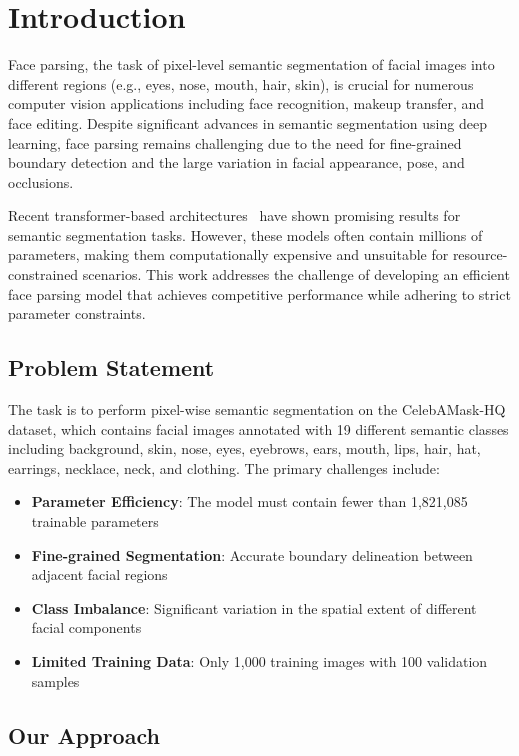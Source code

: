 \section{Introduction}
\label{sec:intro}

Face parsing, the task of pixel-level semantic segmentation of facial images into different regions (e.g., eyes, nose, mouth, hair, skin), is crucial for numerous computer vision applications including face recognition, makeup transfer, and face editing. Despite significant advances in semantic segmentation using deep learning, face parsing remains challenging due to the need for fine-grained boundary detection and the large variation in facial appearance, pose, and occlusions.

Recent transformer-based architectures~\cite{xie2021segformer} have shown promising results for semantic segmentation tasks. However, these models often contain millions of parameters, making them computationally expensive and unsuitable for resource-constrained scenarios. This work addresses the challenge of developing an efficient face parsing model that achieves competitive performance while adhering to strict parameter constraints.

\subsection{Problem Statement}

The task is to perform pixel-wise semantic segmentation on the CelebAMask-HQ dataset, which contains facial images annotated with 19 different semantic classes including background, skin, nose, eyes, eyebrows, ears, mouth, lips, hair, hat, earrings, necklace, neck, and clothing. The primary challenges include:

\begin{itemize}
    \item \textbf{Parameter Efficiency}: The model must contain fewer than 1,821,085 trainable parameters
    \item \textbf{Fine-grained Segmentation}: Accurate boundary delineation between adjacent facial regions
    \item \textbf{Class Imbalance}: Significant variation in the spatial extent of different facial components
    \item \textbf{Limited Training Data}: Only 1,000 training images with 100 validation samples
\end{itemize}

\subsection{Our Approach}

